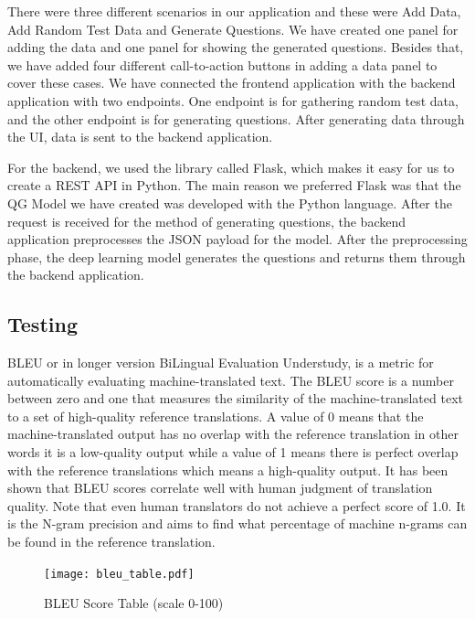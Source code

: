 \documentclass{mefsdp}
\begin{document}
	There were three different scenarios in our application and these were Add Data, Add Random Test Data and Generate Questions. We have created one panel for adding the data and one panel for showing the generated questions. Besides that, we have added four different call-to-action buttons in adding a data panel to cover these cases. We have connected the frontend application with the backend application with two endpoints. One endpoint is for gathering random test data, and the other endpoint is for generating questions. After generating data through the UI, data is sent to the backend application.
	\newline \par
	For the backend, we used the library called Flask, which makes it easy for us to create a REST API in Python. The main reason we preferred Flask was that the QG Model we have created was developed with the Python language. After the request is received for the method of generating questions, the backend application preprocesses the JSON payload for the model. After the preprocessing phase, the deep learning model generates the questions and returns them through the backend application.
	
	\subsection{Testing}
	BLEU or in longer version BiLingual Evaluation Understudy, is a metric for automatically evaluating machine-translated text. The BLEU score is a number between zero and one that measures the similarity of the machine-translated text to a set of high-quality reference translations. A value of 0 means that the machine-translated output has no overlap with the reference translation in other words it is a low-quality output while a value of 1 means there is perfect overlap with the reference translations which means a high-quality output. It has been shown that BLEU scores correlate well with human judgment of translation quality. Note that even human translators do not achieve a perfect score of 1.0. It is the N-gram precision and aims to find what percentage of machine n-grams can be found in the reference translation.
	\newline \par 
	\begin{figure}[h!]
		\centering
		\texttt{[image: bleu\_table.pdf]}
		\caption{BLEU Score Table (scale 0-100)}
	\end{figure}
	
\end{document}
